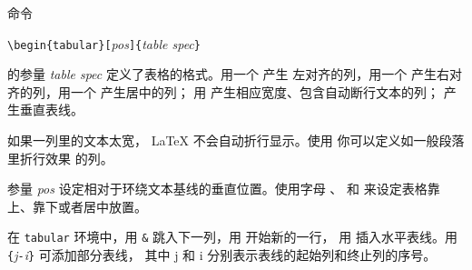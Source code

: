 命令
\begin{lscommand}
\verb|\begin{tabular}[|\emph{pos}\verb|]{|\emph{table spec}\verb|}|
\end{lscommand}
\noindent 的参量 \emph{table
spec} 定义了表格的格式。用一个  产生
左对齐的列，用一个  产生右对齐的列，用一个  产生居中的列；
用  产生相应宽度、包含自动断行文本的列；
\mfr{|} 产生垂直表线。


如果一列里的文本太宽，
\LaTeX{} 不会自动折行显示。使用  你可以定义如一般段落里折行效果
的列。

参量 \emph{pos} 设定相对于环绕文本基线的垂直位置。使用字母 、
 和  来设定表格靠上、靠下或者居中放置。

在 \texttt{tabular} 环境中，用 \verb|&| 跳入下一列，用 \ci{\bs} 开始新的一行，
用  插入水平表线。用 \texttt{\{}\emph{j}\texttt{-}\emph{i}\texttt{\}} 可添加部分表线，
其中 j 和 i 分别表示表线的起始列和终止列的序号。


